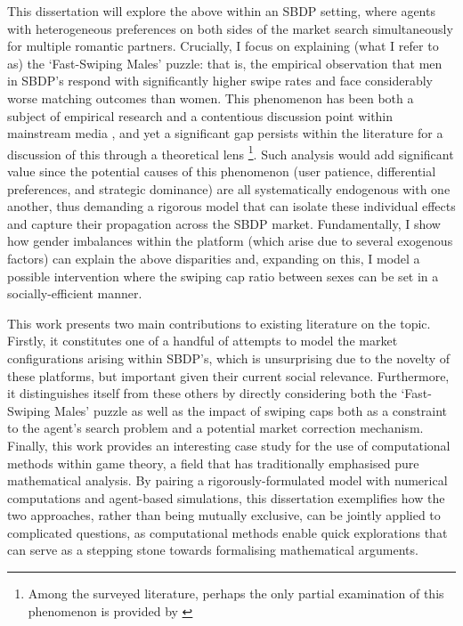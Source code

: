 This dissertation will explore the above within an SBDP setting, where agents with heterogeneous preferences on both sides of the market search simultaneously for multiple romantic partners.
Crucially, I focus on explaining (what I refer to as) the `Fast-Swiping Males' puzzle: that is, the empirical observation that men in SBDP's respond with significantly higher swipe rates and face considerably worse matching outcomes than women. This phenomenon has been both a subject of empirical research \citep{tyson2016first} and a contentious discussion point within mainstream media \citep{web:vice_tindermen, web:wp_miserabletinder}, and yet a significant gap persists within the literature for a discussion of this through a theoretical lens \footnote{Among the surveyed literature, perhaps the only partial examination of this phenomenon is provided by \cite{kanoria2021facilitating}}. 
Such analysis would add significant value since the potential causes of this phenomenon (user patience, differential preferences, and strategic dominance) are all systematically endogenous with one another, thus demanding a rigorous model that can isolate these individual effects and capture their propagation across the SBDP market.
Fundamentally, I show how gender imbalances within the platform (which arise due to several exogenous factors) can explain the above disparities and, expanding on this, I model a possible intervention where the swiping cap ratio between sexes can be set in a socially-efficient manner.

This work presents two main contributions to existing literature on the topic. 
Firstly, it constitutes one of a handful of attempts to model the market configurations arising within SBDP's, which is unsurprising due to the novelty of these platforms, but important given their current social relevance. 
Furthermore, it distinguishes itself from these others by directly considering both the `Fast-Swiping Males' puzzle as well as the impact of swiping caps both as a constraint to the agent's search problem and a potential market correction mechanism.
Finally, this work provides an interesting case study for the use of computational methods within game theory, a field that has traditionally emphasised pure mathematical analysis. 
By pairing a rigorously-formulated model with numerical computations and agent-based simulations, this dissertation exemplifies how the two approaches, rather than being mutually exclusive, can be jointly applied to complicated questions, as computational methods enable quick explorations that can serve as a stepping stone towards formalising mathematical arguments.

